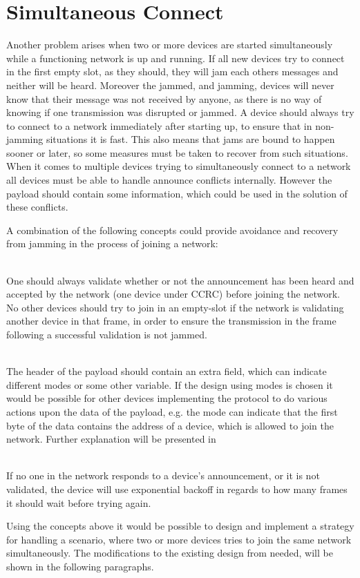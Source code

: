 \newpage
\section{Simultaneous Connect} %
\label{sec:simultaneous_connect}
Another problem arises when two or more devices are started simultaneously while a functioning network is up and running.
If all new devices try to connect in the first empty slot, as they should, they will jam each others messages and neither will be heard.
Moreover the jammed, and jamming, devices will never know that their message was not received by anyone, as there is no way of knowing if one transmission was disrupted or jammed.
A device should always try to connect to a network immediately after starting up, to ensure that in non-jamming situations it is fast.
This also means that jams are bound to happen sooner or later, so some measures must be taken to recover from such situations.
When it comes to multiple devices trying to simultaneously connect to a network all devices must be able to handle announce conflicts internally.
However the payload should contain some information, which could be used in the solution of these conflicts.

A combination of the following concepts could provide avoidance and recovery from jamming in the process of joining a network: 
\begin{description}[labelindent=\parindent]
    \item[Validation]\hfill\\
    One should always validate whether or not the announcement has been heard and accepted by the network (one device under CCRC) before joining the network.
    No other devices should try to join in an empty-slot if the network is validating another device in that frame, in order to ensure the transmission in the frame following a successful validation is not jammed.
    \item[Payload Mode]\hfill\\
    The header of the payload should contain an extra field, which can indicate different modes or some other variable.
    If the design using modes is chosen it would be possible for other devices implementing the protocol to do various actions upon the data of the payload, e.g. the mode can indicate that the first byte of the data contains the address of a device, which is allowed to join the network.
    Further explanation will be presented in 
    \item[Exponential Backoff]\hfill\\ 
    If no one in the network responds to a device's announcement, or it is not validated, the device will use exponential backoff in regards to how many frames it should wait before trying again.
\end{description} 
\noindent
Using the concepts above it would be possible to design and implement a strategy for handling a scenario, where two or more devices tries to join the same network simultaneously.
The modifications to the existing design from  needed, will be shown in the following paragraphs.

